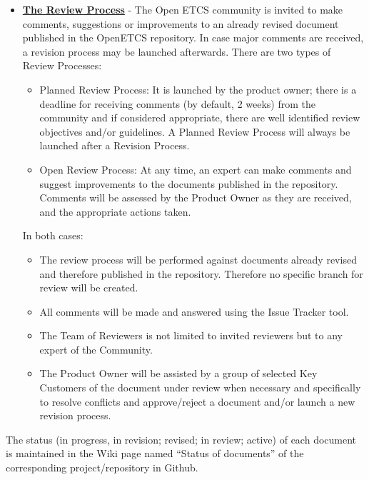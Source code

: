 \documentclass{template/openetcs_article}
\begin{document}
\begin{itemize}
\item \underline{\textbf{The Review Process}} - The Open ETCS community is invited to make comments, suggestions or improvements to an already revised document published in the OpenETCS repository. In case major comments are received, a revision process may be launched afterwards.
There are two types of Review Processes:
\begin{itemize}
\item Planned Review Process: It is launched by the product owner; there is a deadline for receiving comments (by default, 2 weeks) from the community and if considered appropriate, there are well identified review objectives and/or guidelines. A Planned Review Process will always be launched after a Revision Process.
\item Open Review Process: At any time, an expert can make comments and suggest improvements to the documents published in the repository. Comments will be assessed by the Product Owner as they are received, and the appropriate actions taken.
\end{itemize}
In both cases:
\begin{itemize}
\item The review process will be performed against documents already revised and therefore published in the repository. Therefore no specific branch for review will be created.
\item All comments will be made and answered using the Issue Tracker tool.
\item The Team of Reviewers is not limited to invited reviewers but to any expert of the Community.
\item The Product Owner will be assisted by a group of selected Key Customers of the document under review when necessary and specifically to resolve conflicts and approve/reject a document and/or launch a new revision process.
\end{itemize}
\end{itemize}

The status (in progress, in revision; revised; in review; active) of each document is maintained in the Wiki page named “Status of documents” of the corresponding project/repository in Github.
\end{document}
